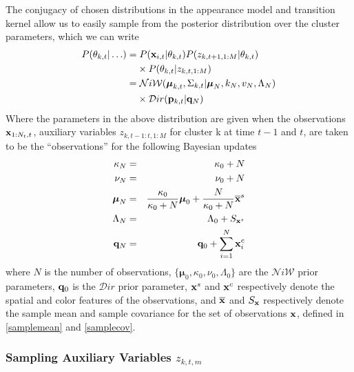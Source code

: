 \documentclass{article}
\begin{document}
The conjugacy of chosen distributions in the appearance model and transition kernel allow us to easily sample from the posterior distribution over the cluster parameters, which we can write
\begin{align}
\begin{split}
P(\theta_{k,t} | \ldots ) = & \hspace{1mm} P(\bold{x}_{i,t} | \theta_{k,t}) P(z_{k,t+1,1:M} | \theta_{k,t})
\\ & \times P(\theta_{k,t} | z_{k,t,1:M}) \\
 = & \hspace{1mm} \mathcal{N}i\mathcal{W}(\boldsymbol{\mu}_{k,t}, \Sigma_{k,t} | \boldsymbol{\mu}_{N}, k_{N}, v_{N}, \Lambda_{N}) \\
  & \times \mathcal{D}ir( \bold{p}_{k,t} | \bold{q}_{N})
\end{split}
\end{align}
Where the parameters in the above distribution are given when the observations $\bold{x}_{1:N_{t},t}$, auxiliary variables $z_{k,t-1:t,1:M}$ for cluster k at time $t-1$ and $t$, are taken to be the ``observations'' for the following Bayesian updates
\begin{eqnarray}
\label{bayesian_update_1}
\kappa_{N} &=& \kappa_{0} + N \\
\label{bayesian_update_2}
\nu_{N} &=& \nu_{0} + N \\
\label{bayesian_update_3}
\boldsymbol{\mu}_{N} &=& \frac{\kappa_{0}}{\kappa_{0}+N} \boldsymbol{\mu}_{0}  +  \frac{N}{\kappa_{0}+N} \overline{\bold{x}}^{s}\\
\Lambda_{N} &=& \Lambda_{0} + S_{\bold{x}^{s}}\\
\label{bayesian_update_4}
\bold{q}_{N} &=& \bold{q}_{0} + \sum_{i=1}^{N} \bold{x}_{i}^{c}
\end{eqnarray}
where $N$ is the number of observations, $\{ \boldsymbol{\mu}_{0}, \kappa_{0}, \nu_{0}, \Lambda_{0} \}$ are the $\mathcal{N}i\mathcal{W}$ prior parameters, $\bold{q}_{0}$ is the $\mathcal{D}ir$ prior parameter, $\bold{x}^{s}$ and $\bold{x}^{c}$ respectively denote the spatial and color features of the observations, and $\overline{\bold{x}}$ and $S_{\bold{x}}$ respectively denote the sample mean and sample covariance for the set of observations $\bold{x}$, defined in \eqref{samplemean} and \eqref{samplecov}.




\subsubsection{Sampling Auxiliary Variables $z_{k,t,m}$}
\label{sec:sample_aux_vars}
\end{document}
